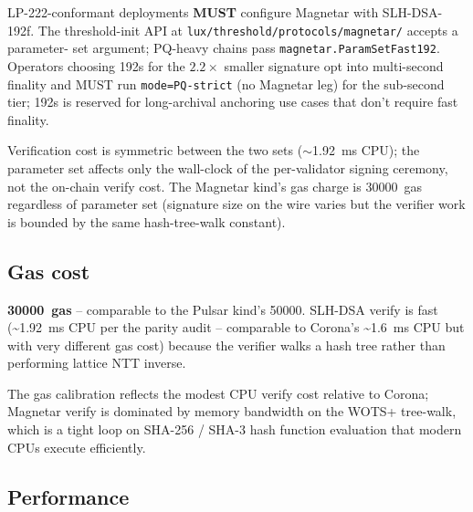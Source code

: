 LP-222-conformant deployments \textbf{MUST} configure Magnetar
with SLH-DSA-192f. The threshold-init API at
\texttt{lux/threshold/protocols/magnetar/} accepts a parameter-
set argument; PQ-heavy chains pass
\texttt{magnetar.ParamSetFast192}. Operators choosing 192s for
the $2.2\times$ smaller signature opt into multi-second finality
and MUST run \texttt{mode=PQ-strict} (no Magnetar leg) for the
sub-second tier; 192s is reserved for long-archival anchoring
use cases that don't require fast finality.

Verification cost is symmetric between the two sets
($\sim$\SI{1.92}{\milli\second} CPU); the parameter set affects
only the wall-clock of the per-validator signing ceremony, not
the on-chain verify cost. The Magnetar kind's gas charge is
\SI{30000}{gas} regardless of parameter set (signature size on
the wire varies but the verifier work is bounded by the same
hash-tree-walk constant).

\subsection{Gas cost}

\textbf{\SI{30000}{gas}} -- comparable to the Pulsar kind's
\SI{50000}{}. SLH-DSA verify is fast (\textasciitilde\SI{1.92}{\milli\second}
CPU per the parity audit -- comparable to Corona's
\textasciitilde\SI{1.6}{\milli\second} CPU but with very
different gas cost) because the verifier walks a hash tree
rather than performing lattice NTT inverse.

The gas calibration reflects the modest CPU verify cost
relative to Corona; Magnetar verify is dominated by memory
bandwidth on the WOTS+ tree-walk, which is a tight loop on
SHA-256 / SHA-3 hash function evaluation that modern CPUs
execute efficiently.

\subsection{Performance}

